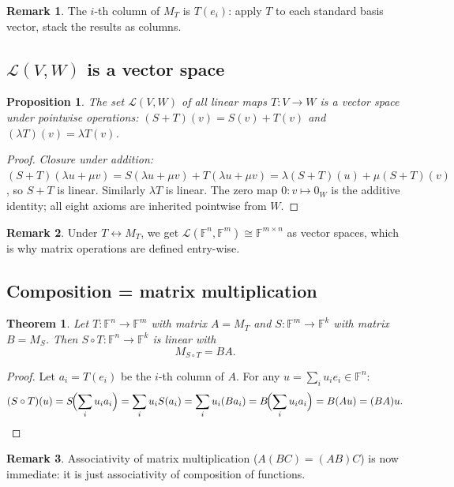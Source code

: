 \documentclass[11pt]{article}
\theoremstyle{definition}
\newtheorem{remark}{Remark}[section]
\theoremstyle{plain}
\newtheorem{theorem}{Theorem}[section]
\newtheorem{proposition}{Proposition}[section]
\begin{document}
\begin{remark}
  The $i$-th column of $M_T$ is $T(e_i)$: apply $T$ to each standard
  basis vector, stack the results as columns.
\end{remark}

\subsection{$\mathcal{L}(V,W)$ is a vector space}

\begin{proposition}
  The set $\mathcal{L}(V,W)$ of all linear maps $T:V\to W$ is a vector
  space under pointwise operations:
  $(S+T)(v)=S(v)+T(v)$ and $(\lambda T)(v)=\lambda T(v)$.
\end{proposition}
\begin{proof}
  \textit{Closure under addition:}
  $(S+T)(\lambda u+\mu v)
  =S(\lambda u+\mu v)+T(\lambda u+\mu v)
  =\lambda(S+T)(u)+\mu(S+T)(v)$,
  so $S+T$ is linear.  Similarly $\lambda T$ is linear.
  The zero map $0:v\mapsto 0_W$ is the additive identity; all eight
  axioms are inherited pointwise from $W$.
\end{proof}

\begin{remark}
  Under $T\leftrightarrow M_T$, we get
  $\mathcal{L}(\mathbb{F}^n,\mathbb{F}^m)\cong\mathbb{F}^{m\times n}$ as
  vector spaces, which is why matrix operations are defined entry-wise.
\end{remark}

\subsection{Composition = matrix multiplication}

\begin{theorem}
  Let $T:\mathbb{F}^n\to\mathbb{F}^m$ with matrix $A=M_T$ and
  $S:\mathbb{F}^m\to\mathbb{F}^k$ with matrix $B=M_S$.  Then
  $S\circ T:\mathbb{F}^n\to\mathbb{F}^k$ is linear with
  \[
    M_{S\circ T} = BA.
  \]
\end{theorem}
\begin{proof}
  Let $a_i = T(e_i)$ be the $i$-th column of $A$.  For any
  $u=\sum_i u_i e_i\in\mathbb{F}^n$:
  \[
    (S\circ T)(u)
    = S\!\Bigl(\sum_i u_i a_i\Bigr)
    = \sum_i u_i S(a_i)
    = \sum_i u_i (Ba_i)
    = B\!\Bigl(\sum_i u_i a_i\Bigr)
    = B(Au) = (BA)u. \qedhere
  \]
\end{proof}

\begin{remark}
  Associativity of matrix multiplication ($A(BC)=(AB)C$) is now
  immediate: it is just associativity of composition of functions.
\end{remark}
\end{document}
